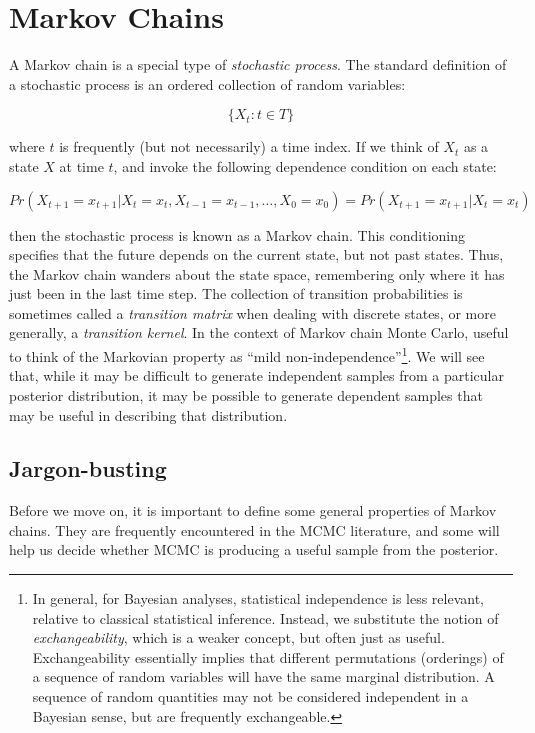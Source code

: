 \documentclass[]{book}
\begin{document}
\section{Markov Chains}

A Markov chain is a special type of \emph{stochastic process}. The standard definition of a stochastic process is an ordered collection of random variables:

\[
\{X_t:t \in T\}
\]

\noindent where $t$ is frequently (but not necessarily) a time index. If we think of $X_t$ as a state $X$ at time $t$, and invoke the following dependence condition on each state:

\[
Pr(X_{t+1}=x_{t+1} | X_t=x_t, X_{t-1}=x_{t-1},\ldots,X_0=x_0) = Pr(X_{t+1}=x_{t+1} | X_t=x_t)
\]

\noindent then the stochastic process is known as a Markov chain. This conditioning specifies that the future depends on the current state, but not past states. Thus, the Markov chain wanders about the state space, remembering only where it has just been in the last time step. The collection of transition probabilities is sometimes called a \emph{transition matrix} when dealing with discrete states, or more generally, a \emph{transition kernel}. In the context of Markov chain Monte Carlo, useful to think of the Markovian property as ``mild non-independence''\footnote{In general, for Bayesian analyses, statistical independence is less relevant, relative to classical statistical inference. Instead, we substitute the notion of \emph{exchangeability}, which is a weaker concept, but often just as useful. Exchangeability essentially implies that different permutations (orderings) of a sequence of random variables will have the same marginal distribution. A sequence of random quantities may not be considered independent in a Bayesian sense, but are frequently exchangeable.}. We will see that, while it may be difficult to generate independent samples from a particular posterior distribution, it may be possible to generate dependent samples that may be useful in describing that distribution.

\subsection{Jargon-busting}

Before we move on, it is important to define some general properties of Markov chains. They are frequently encountered in the MCMC literature, and some will help us decide whether MCMC is producing a useful sample from the posterior.
\end{document}
